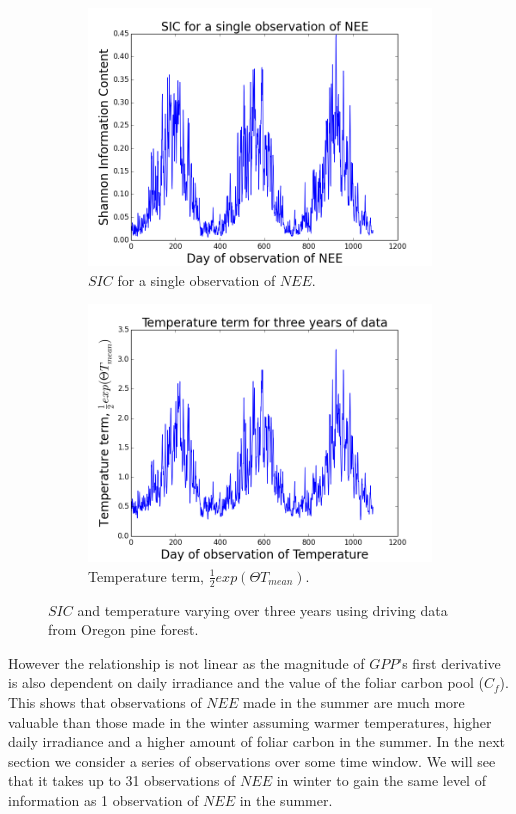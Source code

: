 \documentclass[11pt]{article}
\begin{document}
\begin{figure}[H]
\centering
\begin{subfigure}{.5\textwidth}
  \centering
  \includegraphics[width=.9\linewidth]{SIC1Obs_0_1095.png}
  \caption{$SIC$ for a single observation of $NEE$.}
  \label{fig:sub1}
\end{subfigure}%
\begin{subfigure}{.5\textwidth}
  \centering
  \includegraphics[width=.9\linewidth]{Temp_0_1095.png}
  \caption{Temperature term, $\frac{1}{2}exp(\Theta  T_{mean})$.}
  \label{fig:sub2}
\end{subfigure}
\caption{$SIC$ and temperature varying over three years using driving data from Oregon pine forest.}
\label{fig:SICNEET}
\end{figure}
However the relationship is not linear as the magnitude of $GPP$'s first derivative is also dependent on daily irradiance and the value of the foliar carbon pool ($C_f$). This shows that observations of $NEE$ made in the summer are much more valuable than those made in the winter assuming warmer temperatures, higher daily irradiance and a higher amount of foliar carbon in the summer. In the next section we consider a series of observations over some time window. We will see that it takes up to 31 observations of $NEE$ in winter to gain the same level of information as 1 observation of $NEE$ in the summer.
\end{document}
